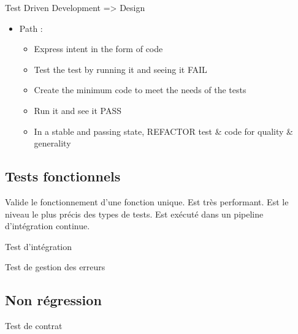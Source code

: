 \documentclass[a4paper,12pt]{article}
\begin{document}
\begin{multicols}{2}
Test Driven Development => Design
\begin{itemize}
\item Path :
\begin{itemize}
\item Express intent in the form of code
\item Test the test by running it and seeing it FAIL
\item Create the minimum code to meet the needs of the tests
\item Run it and see it PASS
\item In a stable and passing state, REFACTOR test \& code for quality \& generality
\end{itemize}
\end{itemize}
\subsection*{Tests fonctionnels}
\label{sec:orgd8f4277}
\begin{description}
\item[{Test unitaire}] Valide le fonctionnement d'une fonction unique. Est très performant. Est le niveau le plus précis des types de tests. Est exécuté dans un pipeline d'intégration continue.
\item[{Test de composant}] 

\item Test d'intégration
\item Test de gestion des erreurs
\end{description}
\subsection*{Non régression}
\label{sec:orgaf7cc6f}
\begin{description}
\item[{Test de contrat}] 


\end{description}
\end{multicols}
\end{document}
